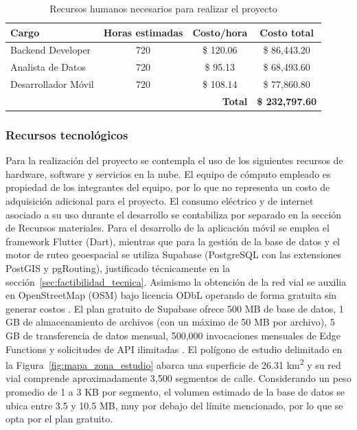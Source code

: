\begin{table}[htbp]
    \centering
    \caption[Recursos humanos necesarios para realizar el proyecto]{Recursos humanos necesarios para realizar el proyecto}
    \label{tab:recursos_humanos}
    \begin{tabular}{|l|c|c|c|}
        \hline
        \textbf{Cargo} & \textbf{Horas estimadas} & \textbf{Costo/hora} & \textbf{Costo total} \\ \hline
        Backend Developer & 720 & \$ 120.06 & \$ 86,443.20 \\ \hline
        Analista de Datos & 720 & \$ 95.13 & \$ 68,493.60 \\ \hline
        Desarrollador Móvil & 720 & \$ 108.14 & \$ 77,860.80 \\ \hline
        \multicolumn{3}{|r|}{\textbf{Total}} & \textbf{\$ 232,797.60} \\ \hline
    \end{tabular}%
\end{table}

\subsubsection{Recursos tecnológicos}

Para la realización del proyecto se contempla el uso de los siguientes recursos de hardware, software y servicios en la nube. El equipo de cómputo empleado es propiedad de los integrantes del equipo, por lo que no representa un costo de adquisición adicional para el proyecto. El consumo eléctrico y de internet asociado a su uso durante el desarrollo se contabiliza por separado en la sección de Recursos materiales. Para el desarrollo de la aplicación móvil se emplea el framework Flutter (Dart), mientras que para la gestión de la base de datos y el motor de ruteo geoespacial se utiliza Supabase (PostgreSQL con las extensiones PostGIS y pgRouting), justificado técnicamente en la sección~\ref{sec:factibilidad_tecnica}. Asimismo la obtención de la red vial se auxilia en OpenStreetMap (OSM) bajo licencia ODbL operando de forma gratuita sin generar costos \cite{osm_legal_pricing}.
El plan gratuito de Supabase ofrece 500 MB de base de datos, 1 GB de almacenamiento de archivos (con un máximo de 50 MB por archivo), 5 GB de transferencia de datos mensual, 500{,}000 invocaciones mensuales de Edge Functions y solicitudes de API ilimitadas \cite{supabase_pricing}. El polígono de estudio delimitado en la Figura~\ref{fig:mapa_zona_estudio} abarca una superficie de 26.31 km\textsuperscript{2} y su red vial comprende aproximadamente 3{,}500 segmentos de calle. Considerando un peso promedio de 1 a 3 KB por segmento, el volumen estimado de la base de datos se ubica entre 3.5 y 10.5 MB, muy por debajo del límite mencionado, por lo que se opta por el plan gratuito.

